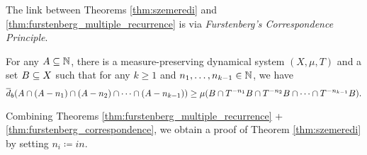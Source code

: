 \documentclass[reqno, twoside]{article}
\begin{document}
    The link between Theorems \ref{thm:szemeredi} and \ref{thm:furstenberg_multiple_recurrence} is via \textit{Furstenberg's Correspondence Principle}.

    \begin{theorem}\label{thm:furstenberg_correspondence}
        For any $A\subseteq\mathbb{N}$, there is a measure-preserving dynamical system $(X,\mu,T)$ and a set $B\subseteq X$ such that for any $k\geq1$ and $n_1,\dots,n_{k-1}\in\mathbb{N}$, we have
        \vspace{-0.05in}
        \begin{equation*}
            \bar{d}_b(A\cap(A-n_1)\cap(A-n_2)\cap\cdots\cap(A-n_{k-1}))\geq\mu(B\cap T^{-n_1}B\cap T^{-n_2}B\cap\cdots\cap T^{-n_{k-1}}B).
            \vspace{-0.05in}
        \end{equation*}
    \end{theorem}

    Combining Theorems \ref{thm:furstenberg_multiple_recurrence} + \ref{thm:furstenberg_correspondence}, we obtain a proof of Theorem \ref{thm:szemeredi} by setting $n_i\coloneqq in$.
\end{document}
